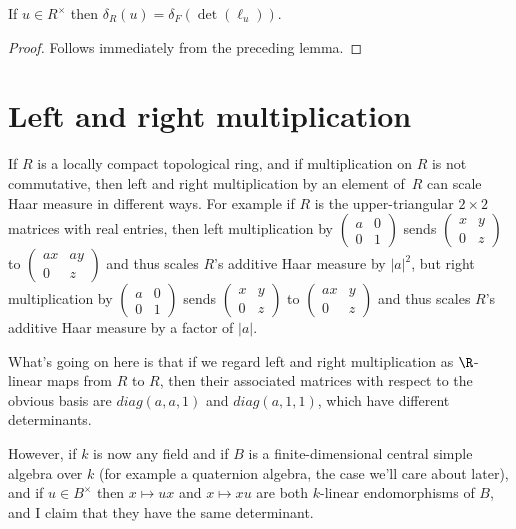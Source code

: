   \begin{corollary}
  \label{MeasureTheory.algebra_ringHaarChar_eq_ringHaarChar_det}
  \leanok
  If $u\in R^\times$ then $\delta_R(u)=\delta_F(\det(\ell_u))$.
\end{corollary}
\begin{proof}
  \leanok
  Follows immediately from the preceding lemma.
\end{proof}

\section{Left and right multiplication}

If $R$ is a locally compact topological ring, and if multiplication on $R$ is not commutative,
then left and right multiplication by an element of~$R$ can scale Haar measure in different ways.
For example if $R$ is the upper-triangular $2\times 2$ matrices with real
entries, then left multiplication by $\begin{pmatrix}a&0\\0&1\end{pmatrix}$
sends $\begin{pmatrix}x&y\\0&z\end{pmatrix}$ to $\begin{pmatrix}ax&ay\\0&z\end{pmatrix}$
and thus scales $R$'s additive
Haar measure by $|a|^2$, but right multiplication by $\begin{pmatrix}a&0\\0&1\end{pmatrix}$
sends $\begin{pmatrix}x&y\\0&z\end{pmatrix}$ to $\begin{pmatrix}ax&y\\0&z\end{pmatrix}$
and thus scales $R$'s additive Haar measure by a factor of $|a|$.

What's going on here is that if we regard left and right multiplication as $\R$-linear
maps from $R$ to $R$, then their associated matrices with respect to the obvious basis
are $diag(a,a,1)$ and $diag(a,1,1)$, which have different determinants.

However, if $k$ is now any field and if $B$ is a finite-dimensional central
simple algebra over $k$ (for example a quaternion algebra, the case we'll care about later),
and if $u\in B^\times$ then $x\mapsto ux$ and $x\mapsto xu$
are both $k$-linear endomorphisms of $B$, and I claim that they have
the same determinant.


